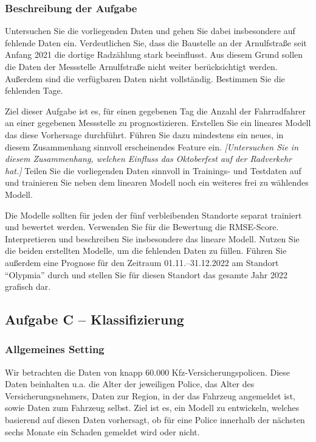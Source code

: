 \documentclass[11pt,a4paper]{article}
\begin{document}
\subsubsection*{Beschreibung der Aufgabe}
Untersuchen Sie die vorliegenden Daten und gehen Sie dabei insbesondere auf fehlende Daten ein. Verdeutlichen Sie, dass die Baustelle an der Arnulfstraße seit Anfang 2021 die dortige Radzählung stark beeinflusst. Aus diesem Grund sollen die Daten der Messstelle Arnulfstraße nicht weiter berücksichtigt werden.
Außerdem sind die verfügbaren Daten nicht vollständig. Bestimmen Sie die fehlenden Tage.

Ziel dieser Aufgabe ist es, für einen gegebenen Tag die Anzahl der Fahrradfahrer an einer gegebenen Messstelle zu prognostizieren. Erstellen Sie ein lineares Modell das diese Vorhersage durchführt.
Führen Sie dazu mindestens ein neues, in diesem Zusammenhang sinnvoll erscheinendes Feature ein. \emph{[Untersuchen Sie in diesem Zusammenhang, welchen Einfluss das Oktoberfest auf der Radverkehr hat.]} Teilen Sie die vorliegenden Daten sinnvoll in Trainings- und Testdaten auf und trainieren Sie neben dem linearen Modell noch ein weiteres frei zu wählendes Modell.

Die Modelle sollten für jeden der fünf verbleibenden Standorte separat trainiert und bewertet werden. Verwenden Sie für die Bewertung die RMSE-Score. Interpretieren und beschreiben Sie insbesondere das lineare Modell. Nutzen Sie die beiden erstellten Modelle, um die fehlenden Daten zu füllen. Führen Sie außerdem eine Prognose für den Zeitraum 01.11.--31.12.2022 am Standort ``Olypmia'' durch und stellen Sie für diesen Standort das gesamte Jahr 2022 grafisch dar.



\newpage
\subsection*{Aufgabe C -- Klassifizierung}
\subsubsection*{Allgemeines Setting}
Wir betrachten die Daten von knapp 60.000 Kfz-Versicherungspolicen. Diese Daten beinhalten u.a. die Alter der jeweiligen Police, das Alter des Versicherungsnehmers, Daten zur Region, in der das Fahrzeug angemeldet ist, sowie Daten zum Fahrzeug selbst. Ziel ist es, ein Modell zu entwickeln, welches basierend auf diesen Daten vorhersagt, ob für eine Police innerhalb der nächsten sechs Monate ein Schaden gemeldet wird oder nicht.
\end{document}
